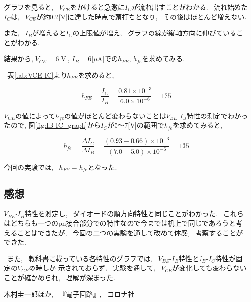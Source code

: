 \documentclass[uplatex,dvipdfmx,a4paper,js=standard, titlepage]{bxjsarticle}
\begin{document}
            グラフを見ると, ~$V_{CE}$をかけると急激に$I_C$が流れ出すことがわかる.
            ~流れ始めた$I_C$は, ~$V_{CE}$が約0.2[V]に達した時点で頭打ちとなり,
            ~その後はほとんど増えない.

            また, ~$I_B$が増えると$I_C$の上限値が増え, ~グラフの線が縦軸方向に伸びていることがわかる.

            結果から, $V_{CE} = 6$[V], $I_B = 6$[$\mu$A]での$h_{FE}$, $h_{fe}$を求めてみる.

            ~表\ref{tab:VCE-IC}より$h_{FE}$を求めると,

            \[
                h_{FE} = \frac{I_C}{I_B} = \frac{0.81 \times 10^{-3}}{6.0 \times 10^{-6}} = 135
            \]

            $V_{CE}$の値によって$h_{fe}$の値がほとんど変わらないことは$V_{BE}$-$I_B$特性の測定でわかったので,
            図\ref{fig:IB-IC_graph}から$I_C$が5〜7[V]の範囲で$h_{fe}$を求めてみると,

            \[
                h_{fe} = \frac{\Delta I_C}{\Delta I_B} = \frac{(0.93 - 0.66) \times 10^{-3}}{(7.0 - 5.0) \times 10^{-6}} = 135
            \]

            今回の実験では, ~$h_{FE} = h_{fe}$となった.

    \subsection{感想}
        $V_{BE}$-$I_B$特性を測定し, ~ダイオードの順方向特性と同じことがわかった.
        ~これらはどちらも一つのpn接合部分での特性なので今までは机上で同じであろうと考えることはできたが,
        ~今回の二つの実験を通して改めて体感, ~考察することができた.

        ~また, ~教科書に載っている各特性のグラフでは, ~$V_{BE}$-$I_B$特性と$I_B$-$I_C$特性が固定の$V_{CE}$の時しか
        示されておらず, ~実験を通して, ~$V_{CE}$が変化しても変わらないことが確かめられ, ~理解が深まった.

\begin{thebibliography}{99}
    \bibitem{} 木村圭一郎ほか, ~『電子回路』, ~コロナ社
\end{thebibliography}
\end{document}
